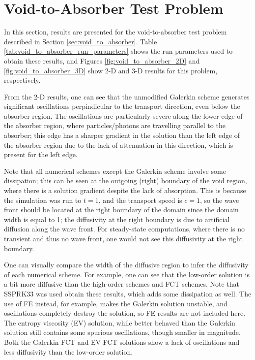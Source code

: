 \section{Void-to-Absorber Test Problem}

In this section, results are presented for the void-to-absorber test problem
described in Section \ref{sec:void_to_absorber}.
Table \ref{tab:void_to_absorber_run_parameters} shows the run parameters used
to obtain these results, and Figures \ref{fig:void_to_absorber_2D}
and \ref{fig:void_to_absorber_3D} show 2-D and 3-D results for this
problem, respectively.

From the 2-D results, one can see that the unmodified Galerkin scheme
generates significant oscillations perpindicular to the transport
direction, even below the absorber region. The oscillations are
particularly severe along the lower edge of the absorber region,
where particles/photons are travelling parallel to the absorber;
this edge has a sharper gradient in the solution than the left
edge of the absorber region due to the lack of attenuation in
this direction, which is present for the left edge.

Note that all numerical schemes except the Galerkin scheme involve some
dissipation; this can be seen at the outgoing (right) boundary of the void
region, where there is a solution gradient despite the lack of
absorption. This is because the simulation was run to $t=1$, and the transport
speed is $c=1$, so the wave front should be located at the right
boundary of the domain since the domain width is equal to 1;
the diffusivity at the right boundary is due to artificial diffusion
along the wave front.
For steady-state computations, where there is no transient and
thus no wave front, one would not see this diffusivity
at the right boundary.

One can visually compare the width
of the diffusive region to infer the diffusivity of each
numerical scheme. For example, one can see that the low-order
solution is a bit more diffusive than the high-order schemes
and FCT schemes.
Note that SSPRK33 was used obtain these results, which
adds some dissipation as well. The use of FE instead, for example,
makes the Galerkin solution unstable, and oscillations completely
destroy the solution, so FE results are not included here.
The entropy viscosity (EV) solution, while better behaved than the
Galerkin solution still contains some spurious oscillations,
though smaller in magnitude. Both the Galerkin-FCT and EV-FCT
solutions show a lack of oscillations and less diffusivity than the low-order
solution.

